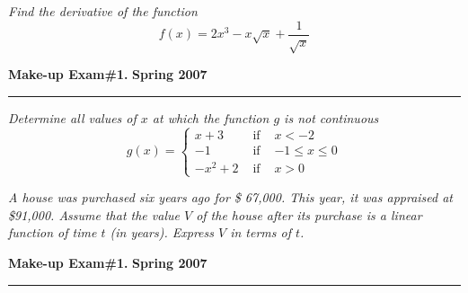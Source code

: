 \documentclass[12pt]{article}
\begin{document}
{{\problem[10 pts] \em Find the derivative of the function}
$$ f(x) = 2x^3 - x \sqrt{x} + \frac{1}{\sqrt{x}}$$
\vspace{3cm}
\begin{flushright}
\end{flushright}
\newpage

\hfill{\large\bf Make-up Exam\#1.}\hfill{\large\bf
  Spring 2007}\hrule

\bigskip
{\problem[10 pts] \em Determine all values of $x$ at which the
  function $g$ is not continuous}
$$ g(x) = \left\{ \begin{array}{lcl}
    x+3 & \mbox{ if } & x<-2 \\
    -1 & \mbox{ if } & -1 \leq x \leq 0 \\
    -x^2+2 & \mbox{ if } & x>0
    \end{array} \right. $$
\vspace{7cm}
\begin{flushright}
\end{flushright}

{\problem[10 pts] \em A house was purchased six years ago for \$
  67,000.  This year, it was appraised at \$91,000.  Assume that the
  value $V$ of the house after its purchase is a linear function of
  time $t$ (in years).  Express $V$ in terms of $t$.
\vspace{7cm}
\begin{flushright}
\end{flushright}
\newpage

\hfill{\large\bf Make-up Exam\#1.}\hfill{\large\bf
  Spring 2007}\hrule

}}
\end{document}
